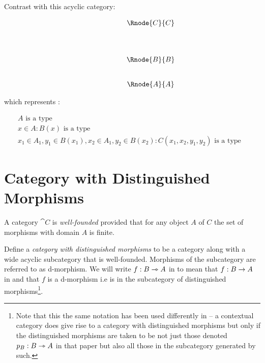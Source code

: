 \documentclass[10pt,a4paper]{scrartcl}
\begin{document}
\noindent
Contrast with this acyclic category:
\begin{center}
\begin{equation}
\begin{array}{p{1.5cm}cccp{2cm}c}
&                & \Rnode{C}{C}&   \\ [1.4cm]
&                & \Rnode{B}{B} &  \\ [0.8cm]
&                & \Rnode{A}{A} &  
\end{array}
\end{equation}

\setlength {\saroffsetA}{-2pt}
\setlength {\saroffsetB}{-2pt}
\setlength {\saroffsetA}{2pt}
\setlength {\saroffsetB}{2pt}
\sarreset
\end{center}
\noindent
which represents :
\addtocounter{equation}{-1}
\begin{align}
&A\mbox{ is a type} && \tag*{(\theequation a)}\\
&x\in A: B(x) \mbox{ is a type} && \tag*{(\theequation b)}\\
&x_1\in A_1, y_1 \in B(x_1), x_2\in A_1, y_2 \in B(x_2) : C(x_1,x_2,y_1,y_2) \mbox{ is a type} && \tag*{(\theequation c)}
\end{align}

\section{Category with Distinguished Morphisms}

\begin{definition}
\noindent A category $\cat{C}$ is \textit{well-founded} provided that for 
any object $A$ of $C$ the set of morphisms with domain $A$ is finite. 
\end{definition}
\begin{definition}
Define a \textit{category with distinguished morphisms} to be a category  along with a wide acyclic subcategory  that is well-founded. 
Morphisms of the subcategory are referred to as d-morphism. 
We will write $f:B \rightarrowtriangle A$ in 
to mean that 
$f: B \rightarrow A$ in  and that $f$ is a d-morphism i.e is in the subcategory  of distinguished morphisms\footnote{
Note that this the same notation has been used differently in \cite{Cartmell86} -- a contextual category does give rise to a category with distinguished morphisms but only
if the distinguished morphisms are taken to be not just those
denoted $p_B: B \rightarrowtriangle A$ in that paper
but also all those in  the subcategory generated by such.
}. 
\end{definition} 
\end{document}
